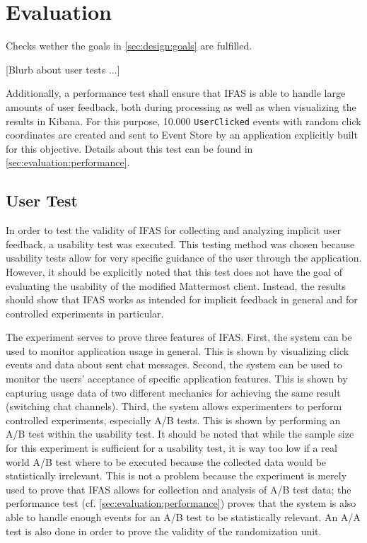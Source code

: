 %
\chapter{Evaluation}
\label{ch:evaluation}


Checks wether the goals in \cref{sec:design:goals} are fulfilled.

[Blurb about user tests ...]

Additionally, a performance test shall ensure that \acf{IFAS} is able to handle large amounts of user feedback, both during processing as well as when visualizing the results in Kibana.
For this purpose, 10.000 \texttt{UserClicked} events with random click coordinates are created and sent to Event Store by an application explicitly built for this objective.
Details about this test can be found in \cref{sec:evaluation:performance}.


\section{User Test}
\label{sec:evaluation:user}

In order to test the validity of \ac{IFAS} for collecting and analyzing implicit user feedback, a usability test was executed.
This testing method was chosen because usability tests allow for very specific guidance of the user through the application.
However, it should be explicitly noted that this test does not have the goal of evaluating the usability of the modified Mattermost client.
Instead, the results should show that \ac{IFAS} works as intended for implicit feedback in general and for controlled experiments in particular.

The experiment serves to prove three features of \ac{IFAS}.
First, the system can be used to monitor application usage in general.
This is shown by visualizing click events and data about sent chat messages.
Second, the system can be used to monitor the users' acceptance of specific application features.
This is shown by capturing usage data of two different mechanics for achieving the same result (switching chat channels).
Third, the system allows experimenters to perform controlled experiments, especially A/B tests.
This is shown by performing an A/B test within the usability test.
It should be noted that while the sample size for this experiment is sufficient for a usability test, it is way too low if a real world A/B test where to be executed because the collected data would be statistically irrelevant.
This is not a problem because the experiment is merely used to prove that \ac{IFAS} allows for collection and analysis of A/B test data; the performance test (cf. \cref{sec:evaluation:performance}) proves that the system is also able to handle enough events for an A/B test to be statistically relevant.
An A/A test is also done in order to prove the validity of the randomization unit.

